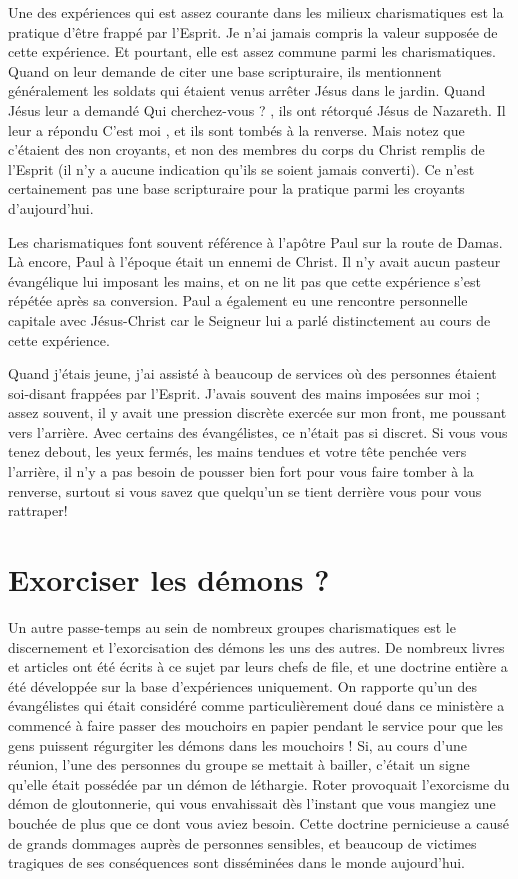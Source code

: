 Une des expériences qui est assez courante dans les milieux charismatiques
 est la pratique d'être \Og frappé par l'Esprit. \Fg{}
 Je n'ai jamais compris la valeur supposée de cette expérience.
 Et pourtant, elle est assez commune parmi les charismatiques.
 Quand on leur demande de citer une base scripturaire,
 ils mentionnent généralement les soldats qui étaient venus arrêter
 Jésus dans le jardin. Quand Jésus leur a demandé\frcolon{}
 \Og Qui cherchez-vous ? \Fg{}, ils ont rétorqué\frcolon{}
 \Og Jésus de Nazareth. \Fg{} Il leur a répondu\frcolon{}
 \Og C'est moi \Fg{}, et ils sont tombés à la renverse.
 Mais notez que c'étaient des non croyants, et non des membres
 du corps du Christ remplis de l'Esprit (il n'y a aucune indication
 qu'ils se soient jamais converti). Ce n'est certainement pas une base
 scripturaire pour la pratique parmi les croyants d'aujourd'hui.

Les charismatiques font souvent référence à l'apôtre Paul sur la route
 de Damas. Là encore, Paul à l'époque était un ennemi de Christ.
 Il n'y avait aucun pasteur évangélique lui imposant les mains,
 et on ne lit pas que cette expérience s'est répétée après sa conversion.
 Paul a également eu une rencontre personnelle capitale avec Jésus-Christ
 car le Seigneur lui a parlé distinctement au cours de cette expérience.

Quand j'étais jeune, j'ai assisté à beaucoup de services où des personnes
 étaient soi-disant frappées par l'Esprit.
 J'avais souvent des mains imposées sur moi ; assez souvent,
 il y avait une pression discrète exercée sur mon front,
 me poussant vers l'arrière. Avec certains des évangélistes,
 ce n'était pas si discret. Si vous vous tenez debout, les yeux fermés,
 les mains tendues et votre tête penchée vers l'arrière,
 il n'y a pas besoin de pousser bien fort pour vous faire tomber
 à la renverse, surtout si vous savez que quelqu'un se tient derrière
 vous pour vous rattraper!
 \nowidow[5]


\section{Exorciser les d\'emons ?}

Un autre passe-temps au sein de nombreux groupes charismatiques
 est le discernement et l'exorcisation des démons les uns des autres.
 De nombreux livres et articles ont été écrits à ce sujet par leurs chefs de file,
 et une doctrine entière a été développée sur la base d'expériences
 uniquement. On rapporte qu'un des évangélistes qui était considéré
 comme particulièrement doué dans ce ministère a commencé à faire passer
 des mouchoirs en papier pendant le service pour que les gens puissent
 régurgiter les démons dans les mouchoirs ! Si, au cours d'une réunion,
 l'une des personnes du groupe se mettait à bailler, c'était un signe
 qu'elle était possédée par un démon de léthargie. Roter provoquait
 l'exorcisme du démon de gloutonnerie, qui vous envahissait dès l'instant
 que vous mangiez une bouchée de plus que ce dont vous aviez besoin.
 Cette doctrine pernicieuse a causé de grands dommages auprès de personnes
 sensibles, et beaucoup de victimes tragiques de ses conséquences
 sont disséminées dans le monde aujourd'hui.

